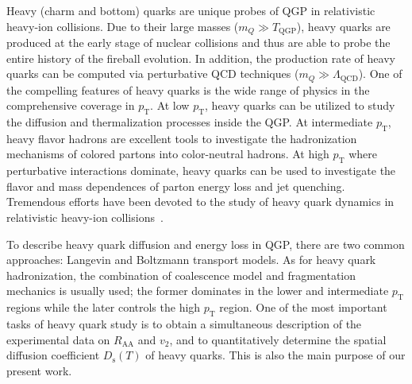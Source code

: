 \documentclass[aps,superscriptaddress,prc,twocolumn,nofootinbib]{revtex4}
\begin{document}
Heavy (charm and bottom) quarks are unique probes of QGP in relativistic heavy-ion collisions.
Due to their large masses ($m_Q \gg T_\mathrm{QGP}$), heavy quarks are produced at the early stage of nuclear collisions and thus are able to probe the entire history of the fireball evolution.
In addition, the production rate of heavy quarks can be computed via perturbative QCD techniques ($m_Q \gg \Lambda_\mathrm{QCD}$).
One of the compelling features of heavy quarks is the wide range of physics in the comprehensive coverage in $p_\mathrm{T}$.
At low $p_\mathrm{T}$, heavy quarks can be utilized to study the diffusion and thermalization processes inside the QGP.
At intermediate $p_\mathrm{T}$, heavy flavor hadrons are excellent tools to investigate the hadronization mechanisms of colored partons into color-neutral hadrons.
At high $p_\mathrm{T}$ where perturbative interactions dominate, heavy quarks can be used to investigate the flavor and mass dependences of parton energy loss and jet quenching.
Tremendous efforts have been devoted to the study of heavy quark dynamics in relativistic heavy-ion collisions~\cite{Dong:2019byy, Rapp:2018qla, Cao:2018ews, Uphoff:2011ad, He:2011qa, Young:2011ug, Alberico:2011zy, Nahrgang:2013saa, Cao:2013ita, Djordjevic:2013xoa, Cao:2015hia, Das:2015ana, Song:2015ykw, Cao:2016gvr, Kang:2016ofv, Prado:2016szr, Cao:2017crw, Liu:2017qah, Li:2018izm, Ke:2018tsh, Zhang:2018nie, Katz:2019fkc, Xing:2019xae, Li:2020kax}.


To describe heavy quark diffusion and energy loss in QGP, there are two common approaches: Langevin and Boltzmann transport models.
As for heavy quark hadronization, the combination of coalescence model and fragmentation mechanics is usually used; the former dominates in the lower and intermediate $p_\mathrm{T}$ regions while the later controls the high $p_\mathrm{T}$ region.
One of the most important tasks of heavy quark study is to obtain a simultaneous description of the experimental data on $R_\mathrm{AA}$ and $v_2$, and to quantitatively determine the spatial diffusion coefficient $D_\mathrm{s}(T)$ of heavy quarks. This is also the main purpose of our present work.
\end{document}
